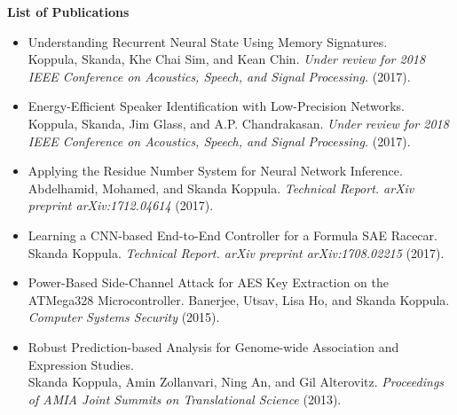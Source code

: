 \documentclass[letterpaper,11pt]{article}
\newcommand{\resitem}[1]{\item[--] #1 \vspace{-4pt}}
\begin{document}
\vspace{0.1in}
\large \textbf{List of Publications\vspace{2mm}} \normalsize
    \begin{itemize}
            \resitem{Understanding Recurrent Neural State Using Memory Signatures. \\ Koppula, Skanda, Khe Chai Sim, and Kean Chin. \textit{Under review for 2018 IEEE Conference on Acoustics, Speech, and Signal Processing. } (2017).}
            \resitem{Energy-Efficient Speaker Identification with Low-Precision Networks. \\ Koppula, Skanda, Jim Glass, and A.P. Chandrakasan. \textit{Under review for 2018 IEEE Conference on Acoustics, Speech, and Signal Processing. } (2017).}
            \resitem{Applying the Residue Number System for Neural Network Inference. \\ Abdelhamid, Mohamed, and Skanda Koppula. \textit{Technical Report. arXiv preprint arXiv:1712.04614} (2017).}
            \resitem{Learning a CNN-based End-to-End Controller for a Formula SAE Racecar. \\ Skanda Koppula. \textit{Technical Report. arXiv preprint arXiv:1708.02215} (2017).}
            \resitem{Power-Based Side-Channel Attack for AES Key Extraction on the ATMega328 Microcontroller. Banerjee, Utsav, Lisa Ho, and Skanda Koppula.  \textit{Computer Systems Security} (2015).}
            \resitem{Robust Prediction-based Analysis for Genome-wide Association and Expression Studies. \\ Skanda Koppula, Amin Zollanvari, Ning An, and Gil Alterovitz. \textit{Proceedings of AMIA Joint Summits on Translational Science} (2013).}
    \end{itemize}
\end{document}
